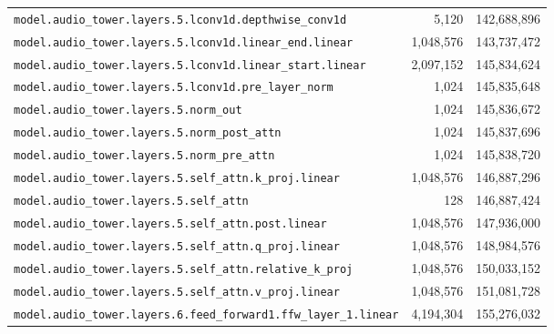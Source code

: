 \documentclass[10pt,a4paper]{article}
\theoremstyle{definition}
\begin{document}
\begin{appendices}
\begin{longtable}{p{9.5cm}rr}
\texttt{model.\allowbreak{}audio\_tower.\allowbreak{}layers.\allowbreak{}5.\allowbreak{}lconv1d.\allowbreak{}depthwise\_conv1d} & 5,120 & 142,688,896 \\
\texttt{model.\allowbreak{}audio\_tower.\allowbreak{}layers.\allowbreak{}5.\allowbreak{}lconv1d.\allowbreak{}linear\_end.\allowbreak{}linear} & 1,048,576 & 143,737,472 \\
\texttt{model.\allowbreak{}audio\_tower.\allowbreak{}layers.\allowbreak{}5.\allowbreak{}lconv1d.\allowbreak{}linear\_start.\allowbreak{}linear} & 2,097,152 & 145,834,624 \\
\texttt{model.\allowbreak{}audio\_tower.\allowbreak{}layers.\allowbreak{}5.\allowbreak{}lconv1d.\allowbreak{}pre\_layer\_norm} & 1,024 & 145,835,648 \\
\texttt{model.\allowbreak{}audio\_tower.\allowbreak{}layers.\allowbreak{}5.\allowbreak{}norm\_out} & 1,024 & 145,836,672 \\
\texttt{model.\allowbreak{}audio\_tower.\allowbreak{}layers.\allowbreak{}5.\allowbreak{}norm\_post\_attn} & 1,024 & 145,837,696 \\
\texttt{model.\allowbreak{}audio\_tower.\allowbreak{}layers.\allowbreak{}5.\allowbreak{}norm\_pre\_attn} & 1,024 & 145,838,720 \\
\texttt{model.\allowbreak{}audio\_tower.\allowbreak{}layers.\allowbreak{}5.\allowbreak{}self\_attn.\allowbreak{}k\_proj.\allowbreak{}linear} & 1,048,576 & 146,887,296 \\
\texttt{model.\allowbreak{}audio\_tower.\allowbreak{}layers.\allowbreak{}5.\allowbreak{}self\_attn} & 128 & 146,887,424 \\
\texttt{model.\allowbreak{}audio\_tower.\allowbreak{}layers.\allowbreak{}5.\allowbreak{}self\_attn.\allowbreak{}post.\allowbreak{}linear} & 1,048,576 & 147,936,000 \\
\texttt{model.\allowbreak{}audio\_tower.\allowbreak{}layers.\allowbreak{}5.\allowbreak{}self\_attn.\allowbreak{}q\_proj.\allowbreak{}linear} & 1,048,576 & 148,984,576 \\
\texttt{model.\allowbreak{}audio\_tower.\allowbreak{}layers.\allowbreak{}5.\allowbreak{}self\_attn.\allowbreak{}relative\_k\_proj} & 1,048,576 & 150,033,152 \\
\texttt{model.\allowbreak{}audio\_tower.\allowbreak{}layers.\allowbreak{}5.\allowbreak{}self\_attn.\allowbreak{}v\_proj.\allowbreak{}linear} & 1,048,576 & 151,081,728 \\
\texttt{model.\allowbreak{}audio\_tower.\allowbreak{}layers.\allowbreak{}6.\allowbreak{}feed\_forward1.\allowbreak{}ffw\_layer\_1.\allowbreak{}linear} & 4,194,304 & 155,276,032 \\

\end{longtable}
\end{appendices}
\end{document}
